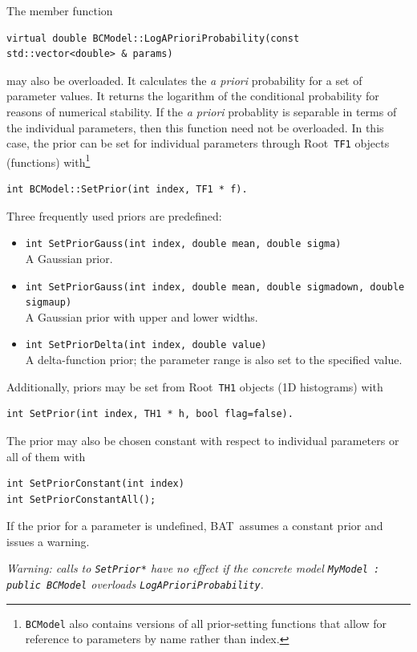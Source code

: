 \documentclass[11pt, a4paper]{article}
\newcommand{\bat}{{\sc BAT}}
\newcommand{\Root}{{\sc Root}}
\newcommand{\code}[1]{\texttt{#1}}
\begin{document}
The member function
%
\begin{verbatim}
virtual double BCModel::LogAPrioriProbability(const std::vector<double> & params)
\end{verbatim}
%
may also be overloaded. It calculates the {\it a priori} probability
for a set of parameter values. It returns the logarithm of the
conditional probability for reasons of numerical stability. If the
{\it a priori} probablity is separable in terms of the individual
parameters, then this function need not be overloaded.  In this case,
the prior can be set for individual parameters through \Root\
\verb|TF1| objects (functions) with\footnote{\code{BCModel} also
  contains versions of all prior-setting functions that allow for
  reference to parameters by name rather than index.}
%
\begin{verbatim}
int BCModel::SetPrior(int index, TF1 * f).
\end{verbatim}
%
Three frequently used priors are predefined:
%
\begin{itemize}
\item \code{int SetPriorGauss(int index, double mean, double sigma)}\\
  A Gaussian prior.

\item \code{int SetPriorGauss(int index, double mean, double sigmadown, double sigmaup)}\\
  A Gaussian prior with upper and lower widths.

\item \code{int SetPriorDelta(int index, double value)}\\
  A delta-function prior; the parameter range is also set to the
  specified value.
\end{itemize}

Additionally, priors may be set from \Root\ \code{TH1} objects (1D
histograms) with
\begin{verbatim}
int SetPrior(int index, TH1 * h, bool flag=false).
\end{verbatim}
%

The prior may also be chosen constant with respect to individual
parameters or all of them with
%
\begin{verbatim}
int SetPriorConstant(int index)
int SetPriorConstantAll();
\end{verbatim}
%

If the prior for a parameter is undefined, \bat\ assumes a constant
prior and issues a warning.

\emph{Warning: calls to \emph{\texttt{SetPrior*}} have no effect if
  the concrete model \emph{\texttt{MyModel : public BCModel}}
  overloads \emph{\texttt{LogAPrioriProbability}}.}
\end{document}
